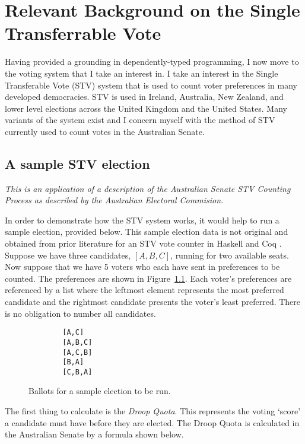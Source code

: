 \chapter{Relevant Background on the Single Transferrable Vote}

Having provided a grounding in dependently-typed programming, I now move to the
voting system that I take an interest in. I take an interest in the Single
Transferable Vote (STV) system that is used to count voter preferences in many
developed democracies. STV is used in Ireland, Australia, New Zealand, and lower
level elections across the United Kingdom and the United States. Many variants
of the system exist and I concern myself with the method of STV currently used
to count votes in the Australian Senate. 

\section{A sample STV election}
\textit{This is an application of a description of the Australian Senate STV Counting Process as described by the Australian Electoral Commision.}

In order to demonstrate how the STV system works, it would help to run a sample
election, provided below. This sample election data is not original and obtained
from prior literature for an STV vote counter in Haskell and Coq
\cite{stv_haskell}. Suppose we have three candidates, $[A, B, C]$, running for
two available seats. Now suppose that we have 5 voters who each have sent in
preferences to be counted. The preferences are shown in
Figure~\ref{sample_election}. Each voter's preferences are referenced by a list
where the leftmost element represents the most preferred candidate and the
rightmost candidate presents the voter's least preferred. There is no obligation
to number all candidates. 


\begin{figure}[ht!!!!!!!!]
    \caption{Ballots for a sample election to be run. }
    \label{sample_election}
    \begin{lstlisting}
        [A,C]
        [A,B,C]
        [A,C,B]
        [B,A]
        [C,B,A]
    \end{lstlisting}
\end{figure}

The first thing to calculate is the \textit{Droop Quota}. This represents the voting `score' a candidate must have before they are elected. The Droop Quota is calculated in the Australian Senate by a formula shown below. 

